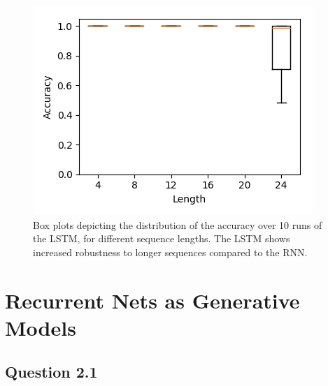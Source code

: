 \documentclass{article}
\begin{document}
\begin{figure}[t]
\centering
\includegraphics[scale=0.7]{img/lstm-acc-Lbox}
 \caption{Box plots depicting the distribution of the accuracy over 10 runs of the LSTM, for different sequence lengths. The LSTM shows increased robustness to longer sequences compared to the RNN.}
\label{fig:lstm_acc_box}
\end{figure}

\section{Recurrent Nets as Generative Models}

\subsection*{Question 2.1}
\end{document}
